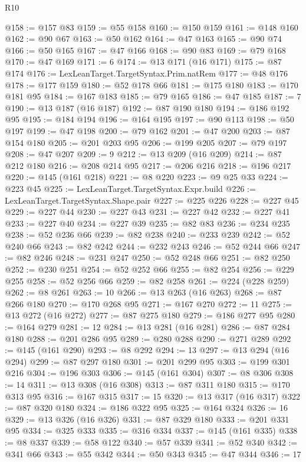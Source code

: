 \begin{lexlean}{R10}
\begin{coremodule}
@158 := @157 @83
@159 := @55 @158
@160 := @150 @159
@161 := @148 @160
@162 := @90 @67
@163 := @50 @162
@164 := @47 @163
@165 := @90 @74
@166 := @50 @165
@167 := @47 @166
@168 := @90 @83
@169 := @79 @168
@170 := @47 @169
@171 := 6
@174 := @13 @171 (@16 @171)
@175 := @87 @174
@176 := LexLeanTarget.TargetSyntax.Prim.natRem
@177 := @48 @176
@178 := @177 @159
@180 := @52 @178 @66
@181 := @175 @180
@183 := @170 @181 @95
@184 := @167 @183
@185 := @79 @165
@186 := @47 @185
@187 := 7
@190 := @13 @187 (@16 @187)
@192 := @87 @190 @180
@194 := @186 @192 @95
@195 := @184 @194
@196 := @164 @195
@197 := @90 @113
@198 := @50 @197
@199 := @47 @198
@200 := @79 @162
@201 := @47 @200
@203 := @87 @154 @180
@205 := @201 @203 @95
@206 := @199 @205
@207 := @79 @197
@208 := @47 @207
@209 := 9
@212 := @13 @209 (@16 @209)
@214 := @87 @212 @180
@216 := @208 @214 @95
@217 := @206 @216
@218 := @196 @217
@220 := @145 (@161 @218)
@221 := @8 @220
@223 := @9 @25 @33
@224 := @223 @45
@225 := LexLeanTarget.TargetSyntax.Expr.build
@226 := LexLeanTarget.TargetSyntax.Shape.pair
@227 := @225 @226
@228 := @227 @45
@229 := @227 @44
@230 := @227 @43
@231 := @227 @42
@232 := @227 @41
@233 := @227 @40
@234 := @227 @39
@235 := @82 @83
@236 := @234 @235
@238 := @52 @236 @66
@239 := @82 @238
@240 := @233 @239
@242 := @52 @240 @66
@243 := @82 @242
@244 := @232 @243
@246 := @52 @244 @66
@247 := @82 @246
@248 := @231 @247
@250 := @52 @248 @66
@251 := @82 @250
@252 := @230 @251
@254 := @52 @252 @66
@255 := @82 @254
@256 := @229 @255
@258 := @52 @256 @66
@259 := @82 @258
@261 := @224 (@228 @259)
@262 := @8 @261
@263 := 10
@266 := @13 @263 (@16 @263)
@268 := @87 @266 @180
@270 := @170 @268 @95
@271 := @167 @270
@272 := 11
@275 := @13 @272 (@16 @272)
@277 := @87 @275 @180
@279 := @186 @277 @95
@280 := @164 @279
@281 := 12
@284 := @13 @281 (@16 @281)
@286 := @87 @284 @180
@288 := @201 @286 @95
@289 := @280 @288
@290 := @271 @289
@292 := @145 (@161 @290)
@293 := @8 @292
@294 := 13
@297 := @13 @294 (@16 @294)
@299 := @87 @297 @180
@301 := @201 @299 @95
@303 := @199 @301 @216
@304 := @196 @303
@306 := @145 (@161 @304)
@307 := @8 @306
@308 := 14
@311 := @13 @308 (@16 @308)
@313 := @87 @311 @180
@315 := @170 @313 @95
@316 := @167 @315
@317 := 15
@320 := @13 @317 (@16 @317)
@322 := @87 @320 @180
@324 := @186 @322 @95
@325 := @164 @324
@326 := 16
@329 := @13 @326 (@16 @326)
@331 := @87 @329 @180
@333 := @201 @331 @95
@334 := @325 @333
@335 := @316 @334
@337 := @145 (@161 @335)
@338 := @8 @337
@339 := @58 @122
@340 := @57 @339
@341 := @52 @340
@342 := @341 @66
@343 := @55 @342
@344 := @50 @343
@345 := @47 @344
@346 := 17

\end{coremodule}
\end{lexlean}

